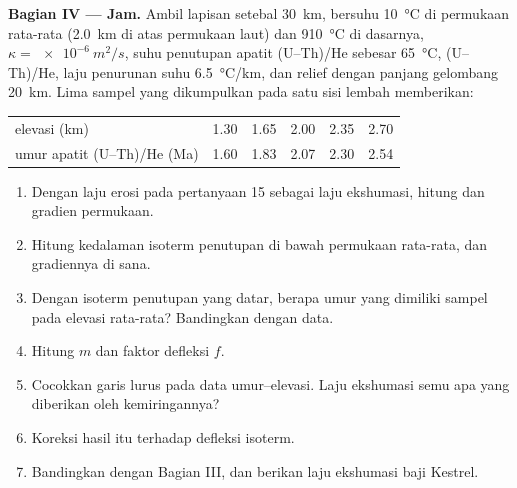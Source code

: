 \begin{problem}
\medskip\noindent\textbf{Bagian IV --- Jam.}
Ambil lapisan setebal \qty{30}{km}, bersuhu \qty{10}{\celsius} di permukaan rata-rata
(\qty{2.0}{km} di atas permukaan laut) dan \qty{910}{\celsius} di dasarnya, $\kappa
= \qty{e-6}{m^2/s}$, suhu penutupan apatit (U--Th)/He sebesar \qty{65}{\celsius},
(U--Th)/He, laju penurunan suhu \qty{6.5}{\celsius/km}, dan relief dengan
panjang gelombang \qty{20}{km}. Lima sampel yang dikumpulkan pada satu sisi lembah memberikan:
\begin{center}
\small
\begin{tabular}{lccccc}
\hline
elevasi (\unit{km}) & 1.30 & 1.65 & 2.00 & 2.35 & 2.70 \\
umur apatit (U--Th)/He (\unit{Ma}) & 1.60 & 1.83 & 2.07 & 2.30 & 2.54 \\
\hline
\end{tabular}
\end{center}
\begin{enumerate}[resume]
  \item Dengan laju erosi pada pertanyaan 15 sebagai laju ekshumasi, hitung
         dan gradien permukaan.
  \item Hitung kedalaman isoterm penutupan di bawah permukaan rata-rata, dan
        gradiennya di sana.
  \item Dengan isoterm penutupan yang datar, berapa umur yang dimiliki sampel pada elevasi
        rata-rata? Bandingkan dengan data.
  \item Hitung $m$ dan faktor defleksi $f$.
  \item Cocokkan garis lurus pada data umur--elevasi. Laju ekshumasi semu apa yang
        diberikan oleh kemiringannya?
  \item Koreksi hasil itu terhadap defleksi isoterm.
  \item Bandingkan dengan Bagian III, dan berikan laju ekshumasi baji
        Kestrel.
\end{enumerate}
\end{problem}
